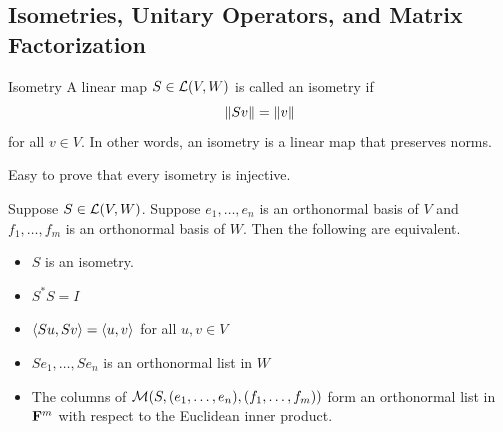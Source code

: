 \documentclass[12pt,a4paper]{article}
\begin{document}
    \subsection{Isometries, Unitary Operators, and Matrix Factorization}
    \begin{defi}{Isometry}
        A linear map $S\in\mathcal{L}(V,W)$ is called an isometry if
        $$
        \left\lVert Sv\right\rVert=\left\lVert v\right\rVert
        $$
        for all $v\in V$. In other words, an isometry is a linear map that preserves norms.
    \end{defi}
    \begin{remark}\label{7.25r}
        Easy to prove that every isometry is injective.
    \end{remark}
    \begin{prop}
        Suppose $S\in\mathcal{L}(V,W)$. Suppose $e_1,\dots,e_n$ is an orthonormal basis of $V$ and $f_1,\dots,f_m$ is an orthonormal basis of $W$. Then the following are equivalent.
        \begin{itemize}
            \item $S$ is an isometry.
            \item $S^*S=I$
            \item $\langle Su,Sv\rangle=\langle u,v\rangle$ for all $u,v\in V$
            \item $Se_1,\dots,Se_n$ is an orthonormal list in $W$
            \item The columns of $\mathcal{M}(S,(e_1,\dots,e_n),(f_1,\dots,f_m))$ form an orthonormal list in $\mathbf{F}^m$ with respect to the Euclidean inner product.
        \end{itemize}
    \end{prop}
    \hfill
\end{document}
